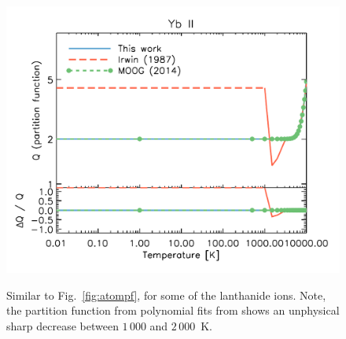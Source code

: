 \documentclass[traditabstract]{aa} %
\begin{document}
\begin{figure}[htp]
{	\includegraphics{figures/Yb_II_partf.pdf}
}
\caption{Similar to Fig.~\ref{fig:atompf}, for some of the lanthanide ions. Note, the  partition function from polynomial fits from \cite{1987A&A...182..348I} shows an unphysical sharp decrease between $1\,000$ and $2\,000$~K.}
\label{fig:atompf2}
\end{figure}
\end{document}
